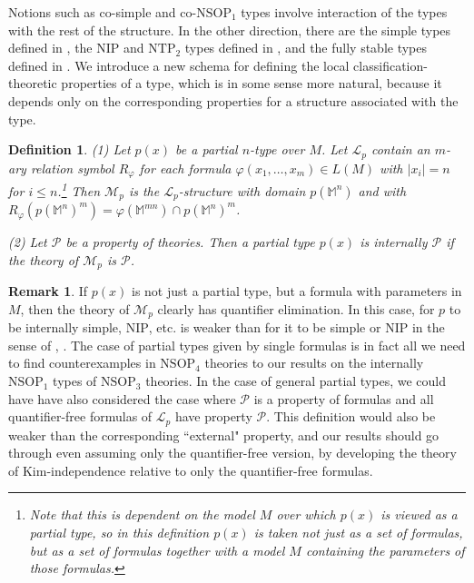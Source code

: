\documentclass[12pt]{amsart}
\newtheorem{definition}{Definition}[section]
\theoremstyle{definition}
\newtheorem{remark}[theorem]{Remark}
\begin{document}
Notions such as co-simple and co-$\mathrm{NSOP}_{1}$ types involve interaction of the types with the rest of the structure. In the other direction, there are the simple types defined in \cite{HKP00}, the $\mathrm{NIP}$ and $\mathrm{NTP}_{2}$ types defined in \cite{Che14}, and the fully stable types defined in \cite{sim12}. We introduce a new schema for defining the local classification-theoretic properties of a type, which is in some sense more natural, because it depends only on the corresponding properties for a structure associated with the type.

\begin{definition}\label{4-internally}
    (1) Let $p(x)$ be a partial $n$-type over $M$. Let $\mathcal{L}_{p}$ contain an $m$-ary relation symbol $R_{\varphi}$ for each formula $\varphi(x_{1}, \ldots, x_{m}) \in L(M)$ with $|x_{i}| = n$ for $i \leq n$.\footnote{Note that this is dependent on the model $M$ over which $p(x)$ is viewed as a partial type, so in this definition $p(x)$ is taken not just as a set of formulas, but as a set of formulas together with a model $M$ containing the parameters of those formulas.} Then $\mathcal{M}_{p}$ is the $\mathcal{L}_{p}$-structure with domain $p(\mathbb{M}^{n})$ and with $R_{\varphi}(p(\mathbb{M}^{n})^{m}) = \varphi(\mathbb{M}^{mn}) \cap p(\mathbb{M}^{n})^{m}$.

    (2) Let $\mathcal{P}$ be a property of theories. Then a partial type $p(x)$ is \emph{internally $\mathcal{P}$} if the theory of $\mathcal{M}_{p}$ is $\mathcal{P}$.
\end{definition}

\begin{remark}\label{4-qe}
    If $p(x)$ is not just a partial type, but a formula with parameters in $M$, then the theory of $\mathcal{M}_{p}$ clearly has quantifier elimination. In this case, for $p$ to be internally simple, $\mathrm{NIP}$, etc. is weaker than for it to be simple or $\mathrm{NIP}$ in the sense of \cite{HKP00}, \cite{Che14}. The case of partial types given by single formulas is in fact all we need to find counterexamples in $\mathrm{NSOP}_{4}$ theories to our results on the internally $\mathrm{NSOP}_{1}$ types of $\mathrm{NSOP}_{3}$ theories. In the case of general partial types, we could have have also considered the case where $\mathcal{P}$ is a property of formulas and all quantifier-free formulas of $\mathcal{L}_{p}$ have property $\mathcal{P}$. This definition would also be weaker than the corresponding ``external" property, and our results should go through even assuming only the quantifier-free version, by developing the theory of Kim-independence relative to only the quantifier-free formulas.
\end{remark}
\end{document}

